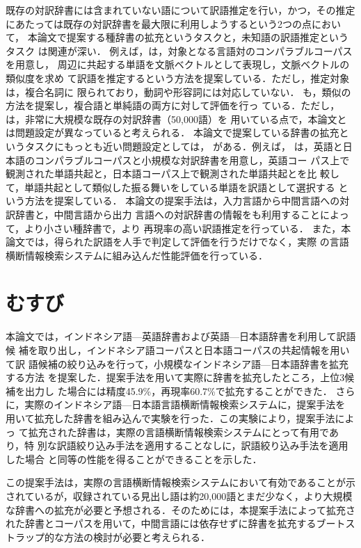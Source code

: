 \documentclass[japanese]{jnlp_1.4}
\begin{document}
既存の対訳辞書には含まれていない語について訳語推定を行い，かつ，その推定
にあたっては既存の対訳辞書を最大限に利用しようするという2つの点において，
本論文で提案する種辞書の拡充というタスクと，未知語の訳語推定というタスク
は関連が深い．
例えば，\cite{tanaka02}は，対象となる言語対のコンパラブルコーパスを用意し，
周辺に共起する単語を文脈ベクトルとして表現し，文脈ベクトルの類似度を求め
て訳語を推定するという方法を提案している．ただし，推定対象は，複合名詞に
限られており，動詞や形容詞には対応していない．
\cite{kaji01}も，類似の方法を提案し，複合語と単純語の両方に対して評価を行っ
ている．ただし，\cite{kaji01}は，非常に大規模な既存の対訳辞書（50,000語）を
用いている点で，本論文とは問題設定が異なっていると考えられる．
本論文で提案している辞書の拡充というタスクにもっとも近い問題設定としては，
\cite{tanaka96,fung98,chiao02,gaussier04}がある．例えば，\cite{tanaka96}
は，英語と日本語のコンパラブルコーパスと小規模な対訳辞書を用意し，英語コー
パス上で観測された単語共起と，日本語コーパス上で観測された単語共起とを比
較して，単語共起として類似した振る舞いをしている単語を訳語として選択する
という方法を提案している．
本論文の提案手法は，入力言語から中間言語への対訳辞書と，中間言語から出力
言語への対訳辞書の情報をも利用することによって，より小さい種辞書で，より
再現率の高い訳語推定を行っている．
また，本論文では，得られた訳語を人手で判定して評価を行うだけでなく，実際
の言語横断情報検索システムに組み込んだ性能評価を行っている．


\section{むすび}
本論文では，インドネシア語—英語辞書および英語—日本語辞書を利用して訳語候
補を取り出し，インドネシア語コーパスと日本語コーパスの共起情報を用いて訳
語候補の絞り込みを行って，小規模なインドネシア語—日本語辞書を拡充する方法
を提案した．提案手法を用いて実際に辞書を拡充したところ，上位3候補を出力し
た場合には精度45.9\%，再現率60.7\%で拡充することができた．
さらに，実際のインドネシア語—日本語言語横断情報検索システムに，提案手法を
用いて拡充した辞書を組み込んで実験を行った．この実験により，提案手法によっ
て拡充された辞書は，実際の言語横断情報検索システムにとって有用であり，特
別な訳語絞り込み手法を適用することなしに，訳語絞り込み手法を適用した場合
と同等の性能を得ることができることを示した．

この提案手法は，実際の言語横断情報検索システムにおいて有効であることが示
されているが，収録されている見出し語は約20,000語とまだ少なく，より大規模
な辞書への拡充が必要と予想される．そのためには，本提案手法によって拡充さ
れた辞書とコーパスを用いて，中間言語には依存せずに辞書を拡充するブートス
トラップ的な方法の検討が必要と考えられる．
\end{document}
